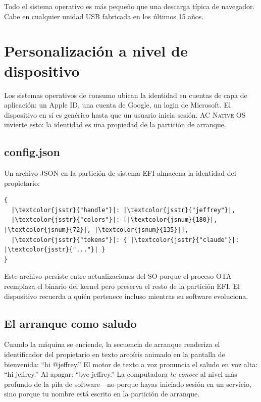 \documentclass[10pt,letterpaper,twocolumn]{article}
\newcommand{\acos}{\textsc{AC Native OS}}
\begin{document}
Todo el sistema operativo es más pequeño que una descarga típica de navegador. Cabe en cualquier unidad USB fabricada en los últimos 15 años.

\section{Personalización a nivel de dispositivo}
\label{sec:personalization}

Los sistemas operativos de consumo ubican la identidad en cuentas de capa de aplicación: un Apple ID, una cuenta de Google, un login de Microsoft. El dispositivo en sí es genérico hasta que un usuario inicia sesión. \acos{} invierte esto: la identidad es una propiedad de la partición de arranque.

\subsection{config.json}

Un archivo JSON en la partición de sistema EFI almacena la identidad del propietario:

\begin{lstlisting}[style=acjsstyle]
{
  |\textcolor{jsstr}{"handle"}|: |\textcolor{jsstr}{"jeffrey"}|,
  |\textcolor{jsstr}{"colors"}|: [|\textcolor{jsnum}{180}|, |\textcolor{jsnum}{72}|, |\textcolor{jsnum}{135}|],
  |\textcolor{jsstr}{"tokens"}|: { |\textcolor{jsstr}{"claude"}|: |\textcolor{jsstr}{"..."}| }
}
\end{lstlisting}

Este archivo persiste entre actualizaciones del SO porque el proceso OTA reemplaza el binario del kernel pero preserva el resto de la partición EFI. El dispositivo recuerda a quién pertenece incluso mientras su software evoluciona.

\subsection{El arranque como saludo}

Cuando la máquina se enciende, la secuencia de arranque renderiza el identificador del propietario en texto arcoíris animado en la pantalla de bienvenida: ``hi @jeffrey.'' El motor de texto a voz pronuncia el saludo en voz alta: ``hi jeffrey.'' Al apagar: ``bye jeffrey.'' La computadora \emph{te conoce} al nivel más profundo de la pila de software---no porque hayas iniciado sesión en un servicio, sino porque tu nombre está escrito en la partición de arranque.
\end{document}

